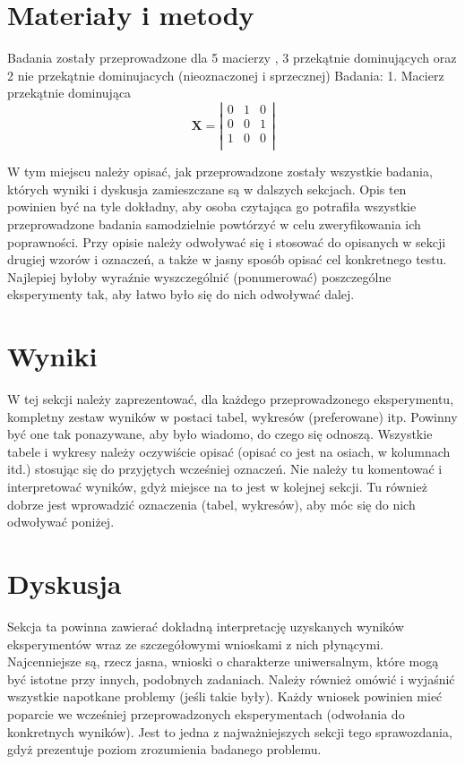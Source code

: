 \documentclass{classrep}
\begin{document}
\section{Materiały i metody}
{
Badania zostały przeprowadzone dla 5 macierzy , 3 przekątnie dominujących oraz 2 nie przekątnie dominujacych (nieoznaczonej i sprzecznej)
Badania:
1. Macierz przekątnie dominująca 
$$
\mathbf{X} =
\left| \begin{array}{ccc}
0 & 1 &  0 \\
0 & 0 &  1 \\
1 & 0 &  0 \\
\end{array} \right|
$$




W tym miejscu należy opisać, jak przeprowadzone zostały wszystkie badania,
których wyniki i dyskusja zamieszczane są w dalszych sekcjach. Opis ten
powinien być na tyle dokładny, aby osoba czytająca go potrafiła wszystkie
przeprowadzone badania samodzielnie powtórzyć w celu zweryfikowania ich
poprawności. Przy opisie należy odwoływać się i stosować do
opisanych w sekcji drugiej wzorów i oznaczeń, a także w jasny sposób opisać
cel konkretnego testu. Najlepiej byłoby wyraźnie wyszczególnić (ponumerować)
poszczególne eksperymenty tak, aby łatwo było się do nich odwoływać dalej.}

\section{Wyniki}
{\color{blue}
W tej sekcji należy zaprezentować, dla każdego przeprowadzonego eksperymentu,
kompletny zestaw wyników w postaci tabel, wykresów (preferowane) itp. Powinny
być one tak ponazywane, aby było wiadomo, do czego się odnoszą. Wszystkie
tabele i wykresy należy oczywiście opisać (opisać co jest na osiach, w
kolumnach itd.) stosując się do przyjętych wcześniej oznaczeń. Nie należy tu
komentować i interpretować wyników, gdyż miejsce na to jest w kolejnej sekcji.
Tu również dobrze jest wprowadzić oznaczenia (tabel, wykresów), aby móc się do
nich odwoływać poniżej.}

\section{Dyskusja}
{\color{blue}
Sekcja ta powinna zawierać dokładną interpretację uzyskanych wyników
eksperymentów wraz ze szczegółowymi wnioskami z nich płynącymi. Najcenniejsze
są, rzecz jasna, wnioski o charakterze uniwersalnym, które mogą być istotne
przy innych, podobnych zadaniach. Należy również omówić i wyjaśnić wszystkie
napotkane problemy (jeśli takie były). Każdy wniosek powinien mieć poparcie we
wcześniej przeprowadzonych eksperymentach (odwołania do konkretnych wyników).
Jest to jedna z najważniejszych sekcji tego sprawozdania, gdyż prezentuje
poziom zrozumienia badanego problemu.}
\end{document}
